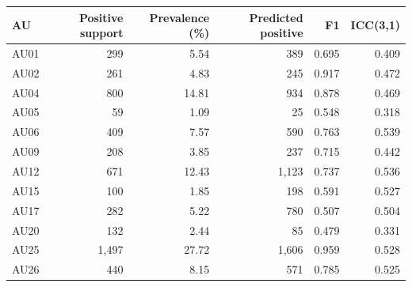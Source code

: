 \begin{tabular}{lrrrrr}
\toprule
AU & Positive support & Prevalence (\%) & Predicted positive & F1 & ICC(3,1) \\
\midrule
AU01 & 299 & 5.54 & 389 & 0.695 & 0.409 \\
AU02 & 261 & 4.83 & 245 & 0.917 & 0.472 \\
AU04 & 800 & 14.81 & 934 & 0.878 & 0.469 \\
AU05 & 59 & 1.09 & 25 & 0.548 & 0.318 \\
AU06 & 409 & 7.57 & 590 & 0.763 & 0.539 \\
AU09 & 208 & 3.85 & 237 & 0.715 & 0.442 \\
AU12 & 671 & 12.43 & 1,123 & 0.737 & 0.536 \\
AU15 & 100 & 1.85 & 198 & 0.591 & 0.527 \\
AU17 & 282 & 5.22 & 780 & 0.507 & 0.504 \\
AU20 & 132 & 2.44 & 85 & 0.479 & 0.331 \\
AU25 & 1,497 & 27.72 & 1,606 & 0.959 & 0.528 \\
AU26 & 440 & 8.15 & 571 & 0.785 & 0.525 \\
\bottomrule
\end{tabular}
